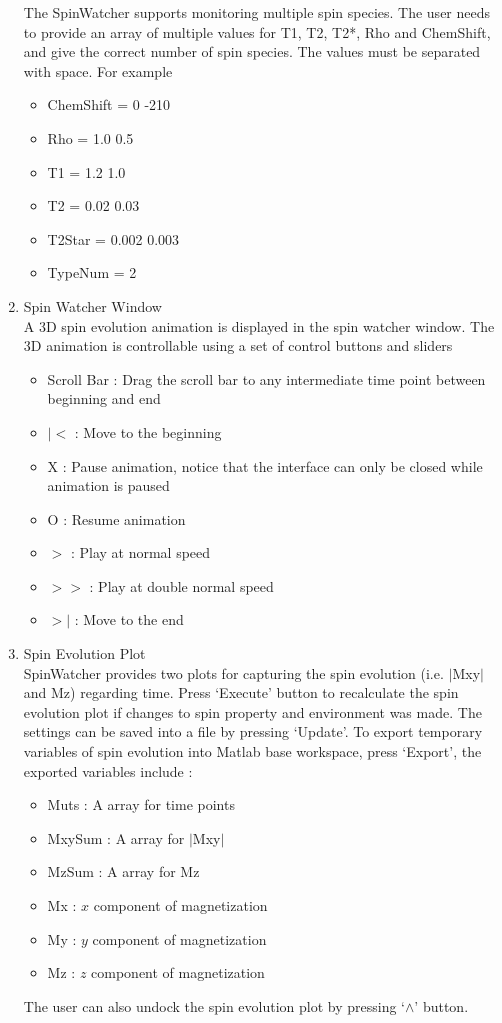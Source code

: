 \documentclass{book}%
\begin{document}
\begin{enumerate}
The SpinWatcher supports monitoring multiple spin species. The user needs to provide an array of multiple values for T1, T2, T2*, Rho and ChemShift, and give the correct number of spin species. The values must be separated with space. For example

\begin{itemize}
	\item ChemShift = 0 -210
	\item Rho = 1.0 0.5
	\item T1 = 1.2 1.0
	\item T2 = 0.02 0.03
	\item T2Star = 0.002 0.003
	\item TypeNum = 2
\end{itemize}


\item Spin Watcher Window \\
A 3D spin evolution animation is displayed in the spin watcher window. The 3D animation is controllable using a set of control buttons and sliders

\begin{itemize}
	\item Scroll Bar : Drag the scroll bar to any intermediate time point between beginning and end 
	\item $\vert <$ : Move to the beginning
	\item X : Pause animation, notice that the interface can only be closed while animation is paused
	\item O : Resume animation
	\item $> $ : Play at normal speed
	\item $>>$ : Play at double normal speed
	\item $> \vert$ : Move to the end
\end{itemize}

\item Spin Evolution Plot \\

SpinWatcher provides two plots for capturing the spin evolution (i.e. $|$Mxy$|$ and Mz) regarding time. Press `Execute' button to recalculate the spin evolution plot if changes to spin property and environment was made. The settings can be saved into a file by pressing `Update'. To export temporary variables of spin evolution into Matlab base workspace, press `Export', the exported variables include :

\begin{itemize}
	\item Muts : A array for time points
	\item MxySum : A array for $|$Mxy$|$
	\item MzSum : A array for Mz
	\item Mx : $x$ component of magnetization
	\item My : $y$ component of magnetization
	\item Mz : $z$ component of magnetization
\end{itemize}

The user can also undock the spin evolution plot by pressing `$\wedge$' button.
\end{enumerate}
\end{document}
